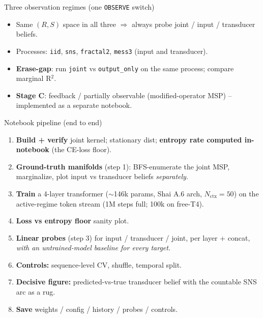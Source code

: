 \documentclass[aspectratio=169]{beamer}
\begin{document}
\begin{frame}[fragile]{Three observation regimes (one \texttt{OBSERVE} switch)}
\centering
{}
\vspace{2mm}
\begin{itemize}
  \item Same $(R,S)$ space in all three $\Rightarrow$ always probe joint / input / transducer beliefs.
  \item Processes: \texttt{iid}, \texttt{sns}, \texttt{fractal2}, \texttt{mess3} (input and transducer).
  \item \textbf{Erase-gap}: run \texttt{joint} vs \texttt{output\_only} on the same process; compare marginal R$^2$.
  \item \textbf{Stage C}: feedback / partially observable (modified-operator MSP) -- implemented as
        a separate notebook.
\end{itemize}
\end{frame}

\begin{frame}{Notebook pipeline (end to end)}
\begin{enumerate}
  \item \textbf{Build + verify} joint kernel; stationary dist; \textbf{entropy rate computed
        in-notebook} (the CE-loss floor).
  \item \textbf{Ground-truth manifolds} (step 1): BFS-enumerate the joint MSP, marginalize,
        plot input vs transducer beliefs \emph{separately}.
  \item \textbf{Train} a 4-layer transformer ($\sim$146k params, Shai A.6 arch, $N_{\text{ctx}}{=}50$)
        on the active-regime token stream (1M steps full; 100k on free-T4).
  \item \textbf{Loss vs entropy floor} sanity plot.
  \item \textbf{Linear probes} (step 3) for input / transducer / joint, per layer + concat,
        \emph{with an untrained-model baseline for every target}.
  \item \textbf{Controls:} sequence-level CV, shuffle, temporal split.
  \item \textbf{Decisive figure:} predicted-vs-true transducer belief with the countable SNS arc
        as a rug.
  \item \textbf{Save} weights / config / history / probes / controls.
\end{enumerate}
\end{frame}
\end{document}
